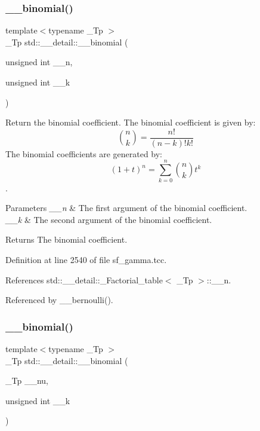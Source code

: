 \subsubsection{\texorpdfstring{\+\_\+\+\_\+binomial()}{\_\_binomial()}\hspace{0.1cm}{\footnotesize\ttfamily [1/2]}}
{\footnotesize\ttfamily template$<$typename \+\_\+\+Tp $>$ \\
\+\_\+\+Tp std\+::\+\_\+\+\_\+detail\+::\+\_\+\+\_\+binomial (\begin{DoxyParamCaption}\item[{unsigned int}]{\+\_\+\+\_\+n,  }\item[{unsigned int}]{\+\_\+\+\_\+k }\end{DoxyParamCaption})}



Return the binomial coefficient. The binomial coefficient is given by\+: \[ \binom{n}{k} = \frac{n!}{(n-k)! k!} \] The binomial coefficients are generated by\+: \[ \left(1 + t\right)^n = \sum_{k=0}^n \binom{n}{k} t^k \]. 


\begin{DoxyParams}{Parameters}
{\em \+\_\+\+\_\+n} & The first argument of the binomial coefficient. \\
\hline
{\em \+\_\+\+\_\+k} & The second argument of the binomial coefficient. \\
\hline
\end{DoxyParams}
\begin{DoxyReturn}{Returns}
The binomial coefficient. 
\end{DoxyReturn}


Definition at line 2540 of file sf\+\_\+gamma.\+tcc.



References std\+::\+\_\+\+\_\+detail\+::\+\_\+\+Factorial\+\_\+table$<$ \+\_\+\+Tp $>$\+::\+\_\+\+\_\+n.



Referenced by \+\_\+\+\_\+bernoulli().

\mbox{\label{namespacestd_1_1____detail_a9ac7d44eebfe3e1a3fb5ebbd9c08bd55}} 
\subsubsection{\texorpdfstring{\+\_\+\+\_\+binomial()}{\_\_binomial()}\hspace{0.1cm}{\footnotesize\ttfamily [2/2]}}
{\footnotesize\ttfamily template$<$typename \+\_\+\+Tp $>$ \\
\+\_\+\+Tp std\+::\+\_\+\+\_\+detail\+::\+\_\+\+\_\+binomial (\begin{DoxyParamCaption}\item[{\+\_\+\+Tp}]{\+\_\+\+\_\+nu,  }\item[{unsigned int}]{\+\_\+\+\_\+k }\end{DoxyParamCaption})}



